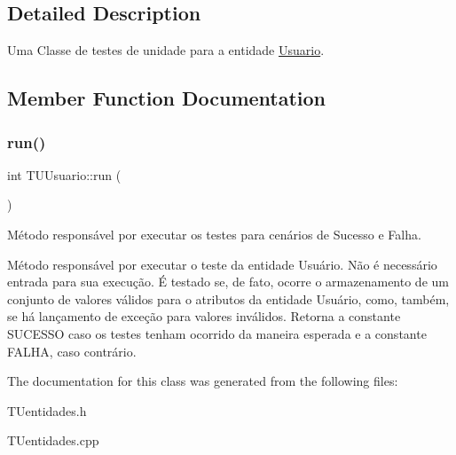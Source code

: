\subsection{Detailed Description}
Uma Classe de testes de unidade para a entidade \hyperlink{classUsuario}{Usuario}. 

\subsection{Member Function Documentation}
\mbox{\label{classTUUsuario_af12e1b9020cfb11a1f659373a70268fa}} 
\subsubsection{\texorpdfstring{run()}{run()}}
{\footnotesize\ttfamily int T\+U\+Usuario\+::run (\begin{DoxyParamCaption}{ }\end{DoxyParamCaption})}



Método responsável por executar os testes para cenários de Sucesso e Falha. 

Método responsável por executar o teste da entidade Usuário. Não é necessário entrada para sua execução. É testado se, de fato, ocorre o armazenamento de um conjunto de valores válidos para o atributos da entidade Usuário, como, também, se há lançamento de exceção para valores inválidos. Retorna a constante S\+U\+C\+E\+S\+SO caso os testes tenham ocorrido da maneira esperada e a constante F\+A\+L\+HA, caso contrário. 

The documentation for this class was generated from the following files\+:\begin{DoxyCompactItemize}
\item 
T\+Uentidades.\+h\item 
T\+Uentidades.\+cpp\end{DoxyCompactItemize}
